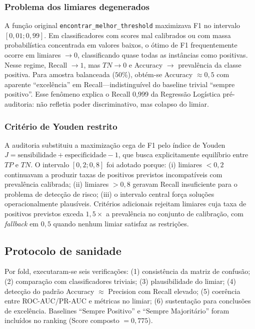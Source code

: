 \documentclass[conference]{IEEEtran}
\begin{document}
\subsubsection{Problema dos limiares degenerados}
A função original \texttt{encontrar\_melhor\_threshold} maximizava F1 no intervalo $[0{,}01; 0{,}99]$. Em classificadores com scores mal calibrados ou com massa probabilística concentrada em valores baixos, o ótimo de F1 frequentemente ocorre em limiares $\rightarrow 0$, classificando quase todas as instâncias como positivas. Nesse regime, Recall $\rightarrow 1$, mas $TN \rightarrow 0$ e Accuracy $\rightarrow$ prevalência da classe positiva. Para amostra balanceada ($50\%$), obtém-se Accuracy $\approx 0{,}5$ com aparente ``excelência'' em Recall---indistinguível do baseline trivial ``sempre positivo''. Esse fenômeno explica o Recall 0{,}999 da Regressão Logística pré-auditoria: não refletia poder discriminativo, mas colapso do limiar.

\subsubsection{Critério de Youden restrito}
A auditoria substituiu a maximização cega de F1 pelo índice de Youden $J = \text{sensibilidade} + \text{especificidade} - 1$, que busca explicitamente equilíbrio entre $TP$ e $TN$. O intervalo $[0{,}2; 0{,}8]$ foi adotado porque: (i) limiares $< 0{,}2$ continuavam a produzir taxas de positivos previstos incompatíveis com prevalência calibrada; (ii) limiares $> 0{,}8$ geravam Recall insuficiente para o problema de detecção de risco; (iii) o intervalo central força soluções operacionalmente plausíveis. Critérios adicionais rejeitam limiares cuja taxa de positivos previstos exceda $1{,}5\times$ a prevalência no conjunto de calibração, com \textit{fallback} em $0{,}5$ quando nenhum limiar satisfaz as restrições.

\subsection{Protocolo de sanidade}
Por fold, executaram-se seis verificações: (1) consistência da matriz de confusão; (2) comparação com classificadores triviais; (3) plausibilidade do limiar; (4) detecção do padrão Accuracy $\approx$ Precision com Recall elevado; (5) coerência entre ROC-AUC/PR-AUC e métricas no limiar; (6) sustentação para conclusões de excelência. Baselines ``Sempre Positivo'' e ``Sempre Majoritário'' foram incluídos no ranking (Score composto $= 0{,}775$).
\end{document}
